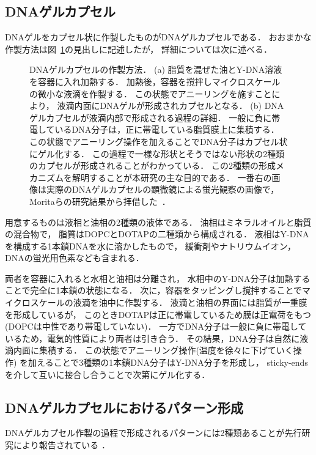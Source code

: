 \subsection{DNAゲルカプセル}
DNAゲルをカプセル状に作製したものがDNAゲルカプセルである．
おおまかな作製方法は図~\ref{fig:capsule}の見出しに記述したが，
詳細については次に述べる．
\begin{figure}
    \centering
    
    \caption{DNAゲルカプセルの作製方法．
        (a) 脂質を混ぜた油とY-DNA溶液を容器に入れ加熱する．
            加熱後，容器を撹拌しマイクロスケールの微小な液滴を作製する．
            この状態でアニーリングを施すことにより，
            液滴内面にDNAゲルが形成されカプセルとなる．
        (b) DNAゲルカプセルが液滴内部で形成される過程の詳細．
            一般に負に帯電しているDNA分子は，正に帯電している脂質膜上に集積する．
            この状態でアニーリング操作を加えることでDNA分子はカプセル状にゲル化する．
            この過程で一様な形状とそうではない形状の2種類のカプセルが形成されることがわかっている．
            この2種類の形成メカニズムを解明することが本研究の主な目的である．
            一番右の画像は実際のDNAゲルカプセルの顕微鏡による蛍光観察の画像で，
            Moritaらの研究結果から拝借した~\cite{moritasan}．
    }
    \label{fig:capsule}
\end{figure}

用意するものは液相と油相の2種類の液体である．
油相はミネラルオイルと脂質の混合物で，
脂質はDOPCとDOTAPの二種類から構成される．
液相はY-DNAを構成する1本鎖DNAを水に溶かしたもので，
緩衝剤やナトリウムイオン，DNAの蛍光用色素なども含まれる．

両者を容器に入れると水相と油相は分離され，
水相中のY-DNA分子は加熱することで完全に1本鎖の状態になる．
次に，容器をタッピングし撹拌することでマイクロスケールの液滴を油中に作製する．
液滴と油相の界面には脂質が一重膜を形成しているが，
このときDOTAPは正に帯電しているため膜は正電荷をもつ(DOPCは中性であり帯電していない)．
一方でDNA分子は一般に負に帯電しているため，電気的性質により両者は引き合う．
その結果，DNA分子は自然に液滴内面に集積する．
この状態でアニーリング操作(温度を徐々に下げていく操作)
を加えることで3種類の1本鎖DNA分子はY-DNA分子を形成し，
sticky-endsを介して互いに接合し合うことで次第にゲル化する．


\subsection{DNAゲルカプセルにおけるパターン形成}
DNAゲルカプセル作製の過程で形成されるパターンには2種類あることが先行研究により報告されている
\cite{morita2017formation}．

